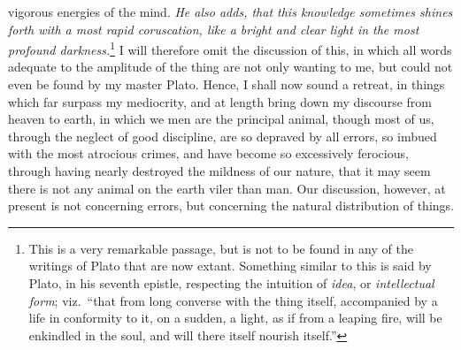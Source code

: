 \documentclass[12pt]{article}
\begin{document}
vigorous energies of the mind. \textit{He also adds, that this knowledge
sometimes shines forth with a most rapid coruscation, like a bright and clear
light in the most profound darkness.}\footnote{This is a very remarkable
passage, but is not to be found in any of the writings of Plato that are now
extant. Something similar to this is said by Plato, in his seventh epistle,
respecting the intuition of \textit{idea}, or \textit{intellectual form};
viz.~``that from long converse with the thing itself, accompanied by a life in
conformity to it, on a sudden, a light, as if from a leaping fire, will be
enkindled in the soul, and will there itself nourish itself.''} I will
therefore omit the discussion of this, in which all words adequate to the
amplitude of the thing are not only wanting to me, but could not even be found
by my master Plato. Hence, I shall now sound a retreat, in things which far
surpass my mediocrity, and at length bring down my discourse from heaven to
earth, in which we men are the principal animal, though most of us, through the
neglect of good discipline, are so depraved by all errors, so imbued with the
most atrocious crimes, and have become so excessively ferocious, through having
nearly destroyed the mildness of our nature, that it may seem there is not any
animal on the earth viler than man. Our discussion, however, at present is not
concerning errors, but concerning the natural distribution of things.
\end{document}
